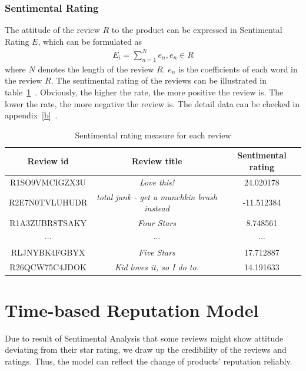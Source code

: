 \documentclass[12pt]{article}%
\begin{document}
\subsubsection{Sentimental Rating}
The attitude of the review $R$ to the product can be expressed in Sentimental Rating $E$, which can be formulated as 
\begin{gather}
 E_{i}=\sum_{n=1} ^{N}e_{n}, e_{n}\in R
\end{gather}
where $N$ denotes the length of the review $R$. $e_{n}$ is the coefficients of each word in the review $R$. The sentimental rating of the reviews can be illustrated in table~\ref{Rating}~. Obviously, the higher the rate, the more positive the review is. The lower the rate, the more negative the review is. The detail data can be checked in appendix~\ref{b}~.


\begin{table}[H]
	\centering
	\caption{Sentimental rating measure for each review}	
	\begin{tabular}{ccc}
		\toprule[1.5pt]
		\multicolumn{1}{m{4cm}}{\centering Review id} &
				\multicolumn{1}{m{7cm}}{\centering Review title} & \multicolumn{1}{m{2cm}}{\centering Sentimental rating} \\
		\midrule[1pt]
		R1SO9VMCIGZX3U  & \textit{Love this!}  	 & 24.020178\\
		R2E7N0TVLUHUDR &   \textit{total junk - get a munchkin brush instead} & -11.512384 \\
		R1A3ZUBR8TSAKY &    \textit{Four Stars}      &8.748561\\
		$\cdots$&  $\cdots$   &	$\cdots$ \\
		RLJNYBK4FGBYX &     \textit{Five Stars}     &17.712887\\
		R26QCW75C4JDOK &    \textit{Kid loves it, so I do to.}      &14.191633\\
		\bottomrule[1.5pt]
	\end{tabular}\label{Rating}
\end{table}


\section{Time-based Reputation Model}
Due to result of Sentimental Analysis that some reviews might show attitude deviating from their star rating, we draw up the credibility of the reviews and ratings. Thus, the model can reflect the change of products' reputation reliably.
\end{document}
